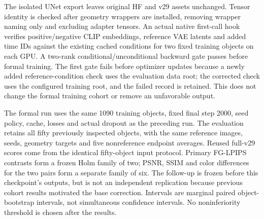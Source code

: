 \documentclass[11pt]{article}
\begin{document}
The isolated UNet export leaves original HF and v29 assets unchanged. Tensor identity is checked after geometry wrappers are installed, removing wrapper naming only and excluding adapter tensors. An actual native first-call hook verifies positive/negative CLIP embeddings, reference VAE latents and added time IDs against the existing cached conditions for two fixed training objects on each GPU. A two-rank conditional/\allowbreak unconditional backward gate passes before formal training. The first gate fails before optimizer updates because a newly added reference-condition check uses the evaluation data root; the corrected check uses the configured training root, and the failed record is retained. This does not change the formal training cohort or remove an unfavorable output.

The formal run uses the same 1090 training objects, fixed final step 2000, seed policy, cache, losses and actual dropout as the preceding run. The evaluation retains all fifty previously inspected objects, with the same reference images, seeds, geometry targets and five nonreference endpoint averages. Reused full-v29 scores come from the identical fifty-object input protocol. Primary FG-LPIPS contrasts form a frozen Holm family of two; PSNR, SSIM and color differences for the two pairs form a separate family of six. The follow-up is frozen before this checkpoint's outputs, but is not an independent replication because previous cohort results motivated the base correction. Intervals are marginal paired object-bootstrap intervals, not simultaneous confidence intervals. No noninferiority threshold is chosen after the results.
\end{document}
